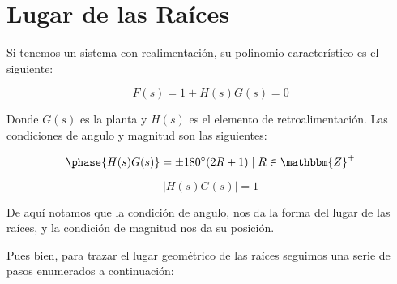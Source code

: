 
\chapter{Lugar de las Raíces}


	Si tenemos un sistema con realimentación, su polinomio característico es el siguiente:

	\begin{equation}
		F(s) = 1 + H(s) G(s) = 0
	\end{equation}

	Donde $G(s)$ es la planta y $H(s)$ es el elemento de retroalimentación. Las condiciones de angulo y magnitud son las siguientes:

	\begin{equation}
		\phase{H(s) G(s)} = \pm 180^{\circ} (2R + 1) \mid R \in \mathbbm{Z}^+
	\end{equation}

	\begin{equation}
		\lvert H(s) G(s) \rvert = 1
	\end{equation}

	De aquí notamos que la condición de angulo, nos da la forma del lugar de las raíces, y la condición de magnitud nos da su posición.

	Pues bien, para trazar el lugar geométrico de las raíces seguimos una serie de pasos enumerados a continuación:

